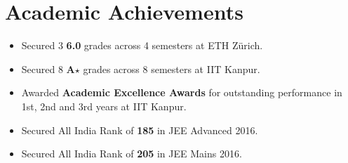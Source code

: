 \section*{Academic Achievements}
\begin{itemize}[itemsep=0mm]

\item Secured 3 \textbf{6.0} grades across 4 semesters at ETH Zürich.
\item Secured 8 \textbf{A$\star$} grades across 8 semesters at IIT Kanpur.
\item Awarded \textbf{Academic Excellence Awards} for outstanding performance in 1st, 2nd and 3rd years at IIT Kanpur.
\item Secured All India Rank of \textbf{185} in JEE Advanced 2016.
\item Secured All India Rank of \textbf{205} in JEE Mains 2016.

\end{itemize}
